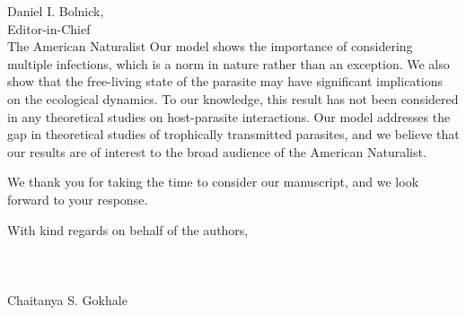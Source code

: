 \documentclass[10,DIN, pagenumber=false, parskip=half,fromalign=right, fromphone=false,fromemail=false, fromurl=false,fromlogo=true, fromrule=false]{scrlttr2}
\begin{document}
\begin{letter}{
\sffamily
\vspace{-0.4cm}
Daniel I. Bolnick,\\
Editor-in-Chief\\
The American Naturalist
}
Our model shows the importance of considering multiple infections, which is a norm in nature rather than an exception. 
We also show that the free-living state of the parasite may have significant implications on the ecological dynamics.
To our knowledge, this result has not been considered in any theoretical studies on host-parasite interactions. 
Our model addresses the gap in theoretical studies of trophically transmitted parasites, and we believe that our results are of interest to the broad audience of the American Naturalist.

We thank you for taking the time to consider our manuscript, and we look forward to your response.

With kind regards on behalf of the authors,\\
\\
\\
\\
Chaitanya S. Gokhale

\end{letter}
\end{document}

